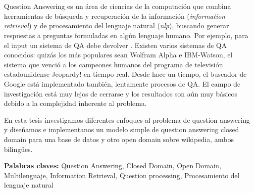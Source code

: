 \chapter*{\runtitulo}

Question Answering es un área de ciencias de la computación que combina herramientas de búsqueda y recuperación
de la información (\textit{information retrieval}) y de procesamiento del lenguaje natural (\textit{nlp}), buscando
generar respuestas a preguntas formuladas en algún lenguaje humano.
Por ejemplo, para el input \textit{} un sistema de QA debe devolver . 
Existen varios sistemas de QA conocidos: quizás los más populares sean Wolfram Alpha e IBM-Watson, el sistema que venció a los campeones humanos del 
programa de televisión estadounidense Jeopardy! en tiempo real. Desde hace un tiempo, el buscador de Google está implementado también, lentamente
procesos de QA. El campo de investigación está muy lejos de cerrarse y los resultados son aún muy básicos debido a la complejidad inherente al problema. 

En esta tesis investigamos diferentes enfoques al problema de question answering y diseñamos e implementanos un modelo simple de question answering closed domain para una base de datos y otro open domain sobre wikipedia, ambos bilingües. 
\bigskip

\noindent\textbf{Palabras claves:} Question Answering, Closed Domain, Open Domain, Multilenguaje, Information Retrieval, Question processing, Procesamiento del lenguaje natural
